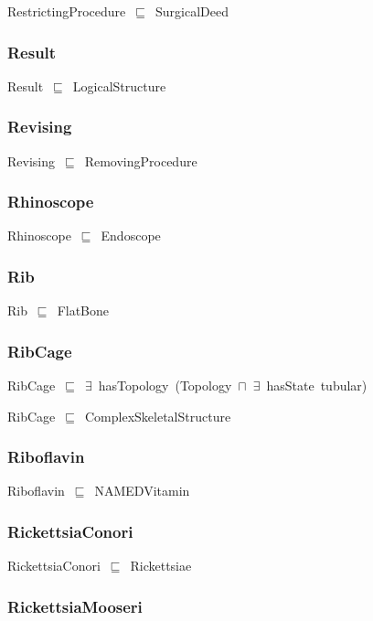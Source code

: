 \documentclass{article}
\begin{document}
RestrictingProcedure~\ensuremath{\sqsubseteq}~SurgicalDeed~

\subsubsection*{Result}

Result~\ensuremath{\sqsubseteq}~LogicalStructure~

\subsubsection*{Revising}

Revising~\ensuremath{\sqsubseteq}~RemovingProcedure~

\subsubsection*{Rhinoscope}

Rhinoscope~\ensuremath{\sqsubseteq}~Endoscope~

\subsubsection*{Rib}

Rib~\ensuremath{\sqsubseteq}~FlatBone~

\subsubsection*{RibCage}

RibCage~\ensuremath{\sqsubseteq}~\ensuremath{\exists}~hasTopology~(Topology~\ensuremath{\sqcap}~\ensuremath{\exists}~hasState~tubular)~

RibCage~\ensuremath{\sqsubseteq}~ComplexSkeletalStructure~

\subsubsection*{Riboflavin}

Riboflavin~\ensuremath{\sqsubseteq}~NAMEDVitamin~

\subsubsection*{RickettsiaConori}

RickettsiaConori~\ensuremath{\sqsubseteq}~Rickettsiae~

\subsubsection*{RickettsiaMooseri}
\end{document}
